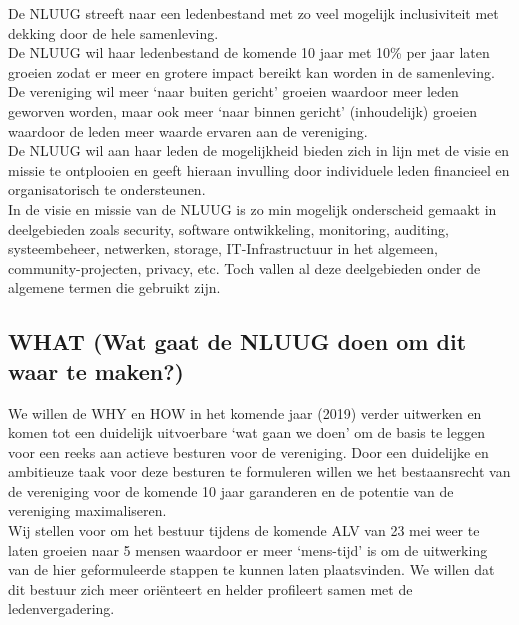\documentclass{article}
\begin{document}
De NLUUG streeft naar een ledenbestand met zo veel mogelijk inclusiviteit met dekking door de hele samenleving. \\

De NLUUG wil haar ledenbestand de komende 10 jaar met 10\% per jaar laten groeien zodat er meer en grotere impact bereikt kan worden in de samenleving. De vereniging wil meer `naar buiten gericht' groeien waardoor meer leden geworven worden, maar ook meer `naar binnen gericht' (inhoudelijk) groeien waardoor de leden meer waarde ervaren aan de vereniging. \\

De NLUUG wil aan haar leden de mogelijkheid bieden zich in lijn met de visie en missie te ontplooien en geeft hieraan invulling door individuele leden financieel en organisatorisch te ondersteunen. \\

In de visie en missie van de NLUUG is zo min mogelijk onderscheid gemaakt in deelgebieden zoals security, software ontwikkeling, monitoring, auditing, systeembeheer, netwerken, storage, IT-Infrastructuur in het algemeen, community-projecten, privacy, etc. Toch vallen al deze deelgebieden onder de algemene termen die gebruikt zijn. \\

\subsection{WHAT (Wat gaat de NLUUG doen om dit waar te maken?)}
We willen de WHY en HOW in het komende jaar (2019) verder uitwerken en komen tot een duidelijk uitvoerbare `wat gaan we doen' om de basis te leggen voor een reeks aan actieve besturen voor de vereniging. Door een duidelijke en ambitieuze taak voor deze besturen te formuleren willen we het bestaansrecht van de vereniging voor de komende 10 jaar garanderen en de potentie van de vereniging maximaliseren. \\

Wij stellen voor om het bestuur tijdens de komende ALV van 23 mei weer te laten groeien naar 5 mensen waardoor er meer `mens-tijd' is om de uitwerking van de hier geformuleerde stappen te kunnen laten plaatsvinden. We willen dat dit bestuur zich meer ori\"enteert en helder profileert samen met de ledenvergadering. \\
\end{document}
